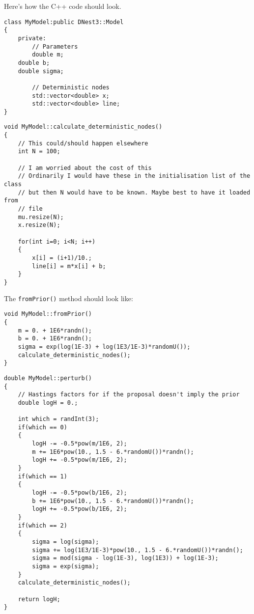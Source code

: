 \documentclass[letterpaper, 11pt]{article}
\begin{document}
Here's how the C++ code should look.

\begin{verbatim}
class MyModel:public DNest3::Model
{
    private:
        // Parameters
        double m;
	double b;
	double sigma;

        // Deterministic nodes
        std::vector<double> x;
        std::vector<double> line;
}
\end{verbatim}

\begin{verbatim}
void MyModel::calculate_deterministic_nodes()
{
    // This could/should happen elsewhere
    int N = 100;

    // I am worried about the cost of this
    // Ordinarily I would have these in the initialisation list of the class
    // but then N would have to be known. Maybe best to have it loaded from
    // file
    mu.resize(N);
    x.resize(N);

    for(int i=0; i<N; i++)
    {
        x[i] = (i+1)/10.;
        line[i] = m*x[i] + b;
    }
}
\end{verbatim}
The {\tt fromPrior()} method should look like:
\begin{verbatim}
void MyModel::fromPrior()
{
    m = 0. + 1E6*randn();
    b = 0. + 1E6*randn();
    sigma = exp(log(1E-3) + log(1E3/1E-3)*randomU());
    calculate_deterministic_nodes();
}
\end{verbatim}


\begin{verbatim}
double MyModel::perturb()
{
    // Hastings factors for if the proposal doesn't imply the prior
    double logH = 0.;

    int which = randInt(3);
    if(which == 0)
    {
        logH -= -0.5*pow(m/1E6, 2);
        m += 1E6*pow(10., 1.5 - 6.*randomU())*randn();
        logH += -0.5*pow(m/1E6, 2);
    }
    if(which == 1)
    {
        logH -= -0.5*pow(b/1E6, 2);
        b += 1E6*pow(10., 1.5 - 6.*randomU())*randn();
        logH += -0.5*pow(b/1E6, 2);
    }
    if(which == 2)
    {
        sigma = log(sigma);
        sigma += log(1E3/1E-3)*pow(10., 1.5 - 6.*randomU())*randn();
        sigma = mod(sigma - log(1E-3), log(1E3)) + log(1E-3);
        sigma = exp(sigma);
    }
    calculate_deterministic_nodes();

    return logH;
}
\end{verbatim}
\end{document}
